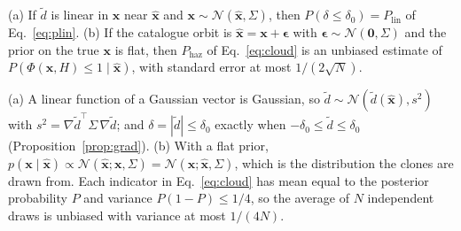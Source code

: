 \begin{proposition}\label{prop:prob}
(a) If $\tilde d$ is linear in $\mathbf{x}$ near $\hat{\mathbf{x}}$ and $\mathbf{x} \sim \mathcal{N}(\hat{\mathbf{x}}, \Sigma)$, then $P(\delta \le \delta_0) = P_{\mathrm{lin}}$ of Eq.~\eqref{eq:plin}. (b) If the catalogue orbit is $\hat{\mathbf{x}} = \mathbf{x} + \boldsymbol\epsilon$ with $\boldsymbol\epsilon \sim \mathcal{N}(\mathbf{0}, \Sigma)$ and the prior on the true $\mathbf{x}$ is flat, then $P_{\mathrm{haz}}$ of Eq.~\eqref{eq:cloud} is an unbiased estimate of $P(\Phi(\mathbf{x}, H) \le 1 \mid \hat{\mathbf{x}})$, with standard error at most $1/(2\sqrt{N})$.
\end{proposition}
\begin{IEEEproof}
(a) A linear function of a Gaussian vector is Gaussian, so $\tilde d \sim \mathcal{N}(\tilde d(\hat{\mathbf{x}}), s^2)$ with $s^2 = \nabla\tilde d^{\top}\Sigma\,\nabla\tilde d$; and $\delta = |\tilde d| \le \delta_0$ exactly when $-\delta_0 \le \tilde d \le \delta_0$ (Proposition~\ref{prop:grad}). (b) With a flat prior, $p(\mathbf{x} \mid \hat{\mathbf{x}}) \propto \mathcal{N}(\hat{\mathbf{x}}; \mathbf{x}, \Sigma) = \mathcal{N}(\mathbf{x}; \hat{\mathbf{x}}, \Sigma)$, which is the distribution the clones are drawn from. Each indicator in Eq.~\eqref{eq:cloud} has mean equal to the posterior probability $P$ and variance $P(1 - P) \le 1/4$, so the average of $N$ independent draws is unbiased with variance at most $1/(4N)$.
\end{IEEEproof}

